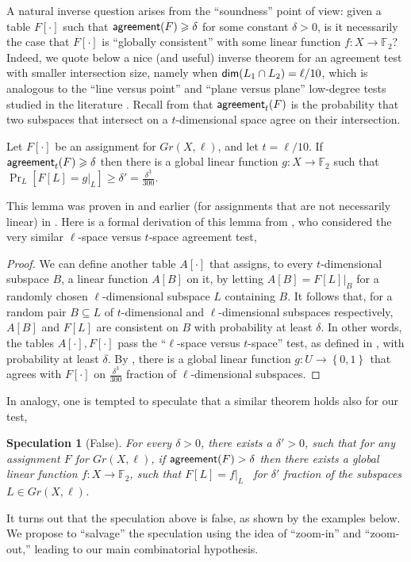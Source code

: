 \documentclass{toc}
\newtheorem{spec}[theorem]{Speculation}
\newcommand\set[1]{{\left\{ #1 \right\}}}
\newcommand\Prob[2]{{\Pr_{#1}\left[ {#2} \right]}}
\newcommand\power[1]{\set{0,1}^{#1}}
\newcommand*\dimm{{\sf dim}}
\renewcommand\ge{\geqslant}
\def\F{\mathbb{F}}
\def\agr{{\sf agreement}}
\begin{document}
A natural inverse question arises from the ``soundness'' point of view:
given a table $F[\cdot]$ such that $\agr(F)\ge\delta$ for some
constant $\delta > 0$, is it necessarily the case that $F[\cdot]$ is
``globally consistent'' with some linear function $f:X \to\F_2$?
Indeed, we quote below a nice (and useful)  inverse theorem for an agreement test
with smaller intersection size, namely when
$\dimm(L_1\cap L_2)=\ell/10$, which is analogous to the ``line versus
point'' and ``plane versus plane'' %
low-degree  %
tests studied in the
literature %
\cite{RS96,AS03,RaSa}.  %
Recall from  that
$\agr_t(F)$ is the probability that two subspaces that intersect on a
$t$-dimensional space agree on their intersection.
\begin{lemma}[Agreement test with intersection size $t=\ell/10$] \label{lemma:lin-aux-1} Let $F[\cdot]$ be an assignment for $Gr(X,\ell)$, and let $t=\ell/10$. If $\agr_{t}(F)\ge \delta$ then there is a global linear function $g:X \to \F_2$ such that $\Prob{L}{F[L] = g|_L}\ge \delta'=\frac{\delta^3}{300}$.
\end{lemma}
This lemma was proven in  \cite[Theorem D.1]{KMS} and earlier (for assignments that are not necessarily linear) in \cite{IKW}. Here is a formal derivation of this lemma from \cite{KMS}, who considered the very similar $\ell$-space versus $t$-space agreement test,
\begin{proof}
We can define another table $A[\cdot]$ that assigns, to every $t$-dimensional subspace $B$,
a linear function $A[B]$ on it, by letting $A[B] = F[L]|_B$ for a randomly chosen $\ell$-dimensional subspace $L$ containing $B$. It follows that, for a random pair $B \subseteq L$ of $t$-dimensional and $\ell$-dimensional subspaces respectively,  $A[B]$ and $F[L]$ are consistent on $B$ with probability
at least %
 $\delta.$ In other words, the tables $A[\cdot], F[\cdot]$ pass the ``$\ell$-space versus $t$-space'' test, as defined in \cite[Section D]{KMS},
with probability at least
%
$\delta.$
By \cite[Theorem D.1]{KMS}, there is a global linear function $g:U \to \power{}$ that agrees with $F[\cdot]$ on
$\frac{\delta^3}{300}$
%
fraction of $\ell$-dimensional subspaces.
\end{proof}
%
In analogy, one is tempted to speculate that a similar theorem holds also for our test,
%
\begin{spec}[False]\label{spec:1}
For every %
$\delta>0$, there exists a
%
$\delta'>0$, such that
for any assignment $F$ for $Gr(X,\ell)$, if $\agr(F)>\delta$ then
there exists a global linear function $f\colon X \to\F_2$,
such that $F[L] = f|_L$ ~for $\delta'$
fraction of the subspaces $L\in Gr(X,\ell)$.
\end{spec}
%
It turns out that the speculation above is false, as shown by the examples below.
%
We propose to ``salvage''
the speculation using the idea of ``zoom-in'' and ``zoom-out,'' leading to our main combinatorial hypothesis.
\end{document}
